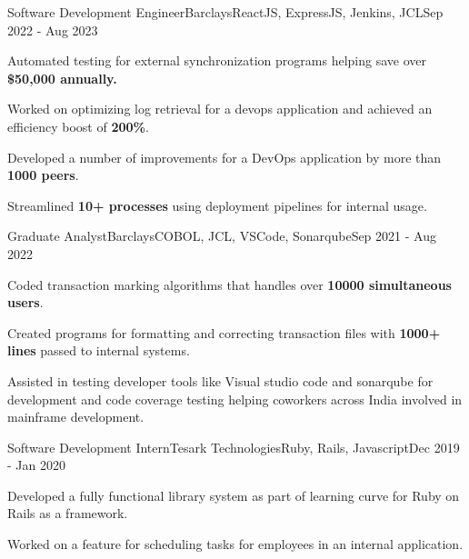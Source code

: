 \documentclass[letterpaper]{resume_config}
\begin{document}
\WorkExperience
    {Software Development Engineer}{Barclays}{ReactJS, ExpressJS, Jenkins, JCL}{Sep 2022 - Aug 2023}
    {
        \item{Automated testing for external synchronization programs helping save over \textbf{\$50,000 annually.}}
        \item {Worked on optimizing log retrieval for a devops application and achieved an efficiency boost of \textbf{200\%}.}
        \item {Developed a number of improvements for a DevOps application by more than \textbf{1000 peers}.} 
        \item {Streamlined \textbf{10+ processes} using deployment pipelines for internal usage.}
    }
\WorkExperience
    {Graduate Analyst}{Barclays}{COBOL, JCL, VSCode, Sonarqube}{Sep 2021 - Aug 2022}
    {
        \item {Coded transaction marking algorithms that handles over \textbf{10000 simultaneous users}.}
        \item {Created programs for formatting and correcting transaction files with \textbf{1000+ lines} passed to internal systems.}
        \item {Assisted in testing developer tools like Visual studio code and sonarqube for development and code coverage testing helping coworkers across India involved in mainframe development.}
    }
\WorkExperience
    {Software Development Intern}{Tesark Technologies}{Ruby, Rails, Javascript}{Dec 2019 - Jan 2020}
    {
        \item {Developed a fully functional library system as part of learning curve for Ruby on Rails as a framework.}
        \item {Worked on a feature for scheduling tasks for employees in an internal application.}
    }

\vspace{-5pt}
\end{document}
